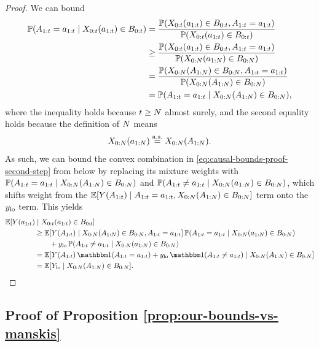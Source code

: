 \begin{proof}
We can bound
\begin{align}
    \Prob(\A_{1:\tx} = \ax_{1:\tx} \mid \X_{0:\tx}(\ax_{1:\tx}) \in \B_{0:\tx})
        &= \frac{\Prob(\X_{0:\tx}(\ax_{1:\tx}) \in \B_{0:\tx}, \A_{1:\tx} = \ax_{1:\tx})}{\Prob(\X_{0:\tx}(\ax_{1:\tx}) \in \B_{0:\tx})} \notag \\
        &\geq \frac{\Prob(\X_{0:\tx}(\ax_{1:\tx}) \in \B_{0:\tx}, \A_{1:\tx} = \ax_{1:\tx})}{\Prob(\X_{0:\N}(\ax_{1:\N}) \in \B_{0:\N})} \notag \\
        &= \frac{\Prob(\X_{0:\N}(\A_{1:\N}) \in \B_{0:\N}, \A_{1:\tx} = \ax_{1:\tx})}{\Prob(\X_{0:\N}(\A_{1:\N}) \in \B_{0:\N})} \notag \\
        &= \Prob(\A_{1:\tx} = \ax_{1:\tx} \mid \X_{0:\N}(\A_{1:\N}) \in \B_{0:\N}), %
\end{align}
where the inequality holds because $t \geq N$ almost surely, and the second equality holds because the definition of $N$ means
\[
    X_{0:N}(a_{1:N}) \overset{\mathrm{a.s.}}{=} X_{0:N}(A_{1:N}).
\]
As such, we can bound the convex combination in \eqref{eq:causal-bounds-proof-second-step} from below by replacing its mixture weights with $\mathbb{P}(A_{1:t} = a_{1:t} \mid X_{0:N}(A_{1:N}) \in B_{0:N})$ and $\mathbb{P}(A_{1:t} \neq a_{1:t} \mid X_{0:N}(a_{1:N}) \in B_{0:N})$, which shifts weight from the $\mathbb{E}[Y(A_{1:t}) \mid A_{1:t} = a_{1:t}, X_{0:N}(A_{1:N}) \in B_{0:N}]$ term onto the $y_{\mathrm{lo}}$ term.
This yields
\begin{align*}
    &\E[\Y(\ax_{1:\tx}) \mid \X_{0:\tx}(\ax_{1:\tx}) \in \B_{0:\tx}] \\
        &\qquad\qquad\geq \E[\Y(\A_{1:\tx}) \mid \X_{0:\N}(\A_{1:\N}) \in \B_{0:\N}, \A_{1:\tx} = \ax_{1:\tx}] \, \Prob(\A_{1:\tx} = \ax_{1:\tx} \mid \X_{0:\N}(\ax_{1:\N}) \in \B_{0:\N}) \\
        &\qquad\qquad\qquad+ \ylo \, \Prob(\A_{1:\tx} \neq \ax_{1:\tx} \mid \X_{0:\N}(\ax_{1:\N}) \in \B_{0:\N}) \\
        &\qquad\qquad= \E[\Y(\A_{1:\tx}) \, \ind(\A_{1:\tx} = \ax_{1:\tx}) + \ylo \, \ind(\A_{1:\tx} \neq \ax_{1:\tx}) \mid \X_{0:\N}(\A_{1:\N}) \in \B_{0:\N}] \\
        &\qquad\qquad= \E[\Ylo \mid \X_{0:\N}(\A_{1:\N}) \in \B_{0:\N}].
\end{align*}
\end{proof}

\subsection{Proof of Proposition \ref{prop:our-bounds-vs-manskis}}

